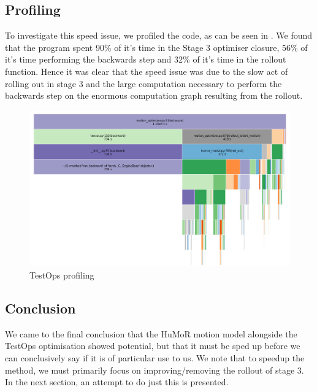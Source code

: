 \subsection{Profiling}
To investigate this speed issue, we profiled the code, as can be seen in . We found that the program spent 90\% of it's time in the Stage 3 optimiser closure, 56\% of it's time performing the backwards step and 32\% of it's time in the rollout function. Hence it was clear that the speed issue was due to the slow act of rolling out in stage 3 and the large computation necessary to perform the backwards step on the enormous computation graph resulting from the rollout.

\begin{figure}[!ht]
    \centering
    \includegraphics[width=1\textwidth]{Figures/humor/profiling/profiling.png}
    \caption{TestOps profiling}
    \label{fig:humor_profiling}
\end{figure}

\subsection{Conclusion}
We came to the final conclusion that the HuMoR motion model alongside the TestOps optimisation showed potential, but that it must be sped up before we can conclusively say if it is of particular use to us. We note that to speedup the method, we must primarily focus on improving/removing the rollout of stage 3. In the next section, an attempt to do just this is presented.
